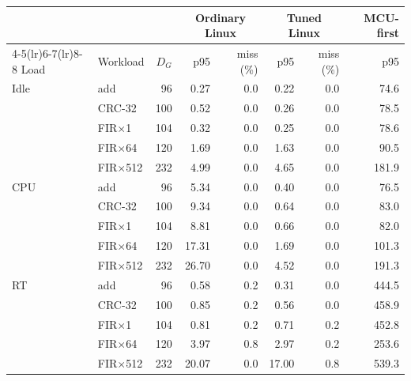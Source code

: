 \begin{tabular}{llrrrrrr}
\toprule
 & & & \multicolumn{2}{c}{Ordinary Linux} & \multicolumn{2}{c}{Tuned Linux} & MCU-first \\
\cmidrule(lr){4-5}\cmidrule(lr){6-7}\cmidrule(lr){8-8}
Load & Workload & $D_G$ & p95 & miss (\%) & p95 & miss (\%) & p95 \\
\midrule
Idle & add & 96 & 0.27 & 0.0 & 0.22 & 0.0 & 74.6 \\
 & CRC-32 & 100 & 0.52 & 0.0 & 0.26 & 0.0 & 78.5 \\
 & FIR$\times$1 & 104 & 0.32 & 0.0 & 0.25 & 0.0 & 78.6 \\
 & FIR$\times$64 & 120 & 1.69 & 0.0 & 1.63 & 0.0 & 90.5 \\
 & FIR$\times$512 & 232 & 4.99 & 0.0 & 4.65 & 0.0 & 181.9 \\
\midrule
CPU & add & 96 & 5.34 & 0.0 & 0.40 & 0.0 & 76.5 \\
 & CRC-32 & 100 & 9.34 & 0.0 & 0.64 & 0.0 & 83.0 \\
 & FIR$\times$1 & 104 & 8.81 & 0.0 & 0.66 & 0.0 & 82.0 \\
 & FIR$\times$64 & 120 & 17.31 & 0.0 & 1.69 & 0.0 & 101.3 \\
 & FIR$\times$512 & 232 & 26.70 & 0.0 & 4.52 & 0.0 & 191.3 \\
\midrule
RT & add & 96 & 0.58 & 0.2 & 0.31 & 0.0 & 444.5 \\
 & CRC-32 & 100 & 0.85 & 0.2 & 0.56 & 0.0 & 458.9 \\
 & FIR$\times$1 & 104 & 0.81 & 0.2 & 0.71 & 0.2 & 452.8 \\
 & FIR$\times$64 & 120 & 3.97 & 0.8 & 2.97 & 0.2 & 253.6 \\
 & FIR$\times$512 & 232 & 20.07 & 0.0 & 17.00 & 0.8 & 539.3 \\
\bottomrule
\end{tabular}
